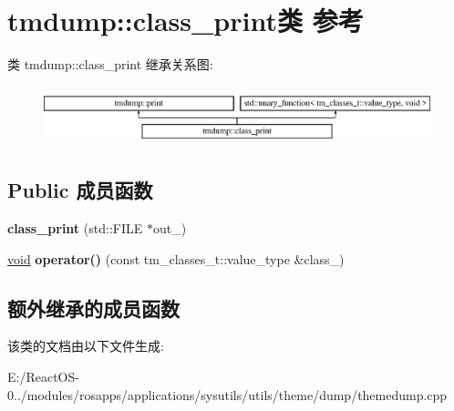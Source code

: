 \hypertarget{classtmdump_1_1class__print}{}\section{tmdump\+:\+:class\+\_\+print类 参考}
\label{classtmdump_1_1class__print}
类 tmdump\+:\+:class\+\_\+print 继承关系图\+:\begin{figure}[H]
\begin{center}
\leavevmode
\includegraphics[height=1.733746cm]{classtmdump_1_1class__print}
\end{center}
\end{figure}
\subsection*{Public 成员函数}
\begin{DoxyCompactItemize}
\item 
\mbox{\label{classtmdump_1_1class__print_a3f94b6e0f02629c02386de1db3382156}} 
{\bfseries class\+\_\+print} (std\+::\+F\+I\+LE $\ast$out\+\_\+)
\item 
\mbox{\label{classtmdump_1_1class__print_a1fae23dac701e07c00e7c9f21e0d6ff0}} 
\hyperlink{interfacevoid}{void} {\bfseries operator()} (const tm\+\_\+classes\+\_\+t\+::value\+\_\+type \&class\+\_\+)
\end{DoxyCompactItemize}
\subsection*{额外继承的成员函数}


该类的文档由以下文件生成\+:\begin{DoxyCompactItemize}
\item 
E\+:/\+React\+O\+S-\/0../modules/rosapps/applications/sysutils/utils/theme/dump/themedump.\+cpp\end{DoxyCompactItemize}
